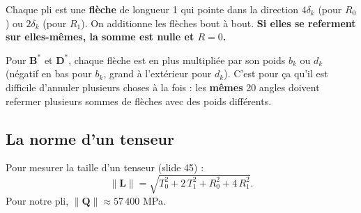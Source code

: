 \documentclass[11pt,a4paper]{article}
\newcommand{\Bs}{\mathbf{B}^{*}}
\newcommand{\Ds}{\mathbf{D}^{*}}
\newcommand{\Q}{\mathbf{Q}}
\begin{document}
\begin{idee}
Chaque pli est une \textbf{flèche} de longueur 1 qui pointe dans la
direction $4\delta_k$ (pour $R_0$) ou $2\delta_k$ (pour $R_1$). On additionne
les flèches bout à bout. \textbf{Si elles se referment sur elles-mêmes, la
somme est nulle et $R = 0$.}
\end{idee}

\begin{center}
\end{center}

Pour $\Bs$ et $\Ds$, chaque flèche est en plus multipliée par son poids
$b_k$ ou $d_k$ (négatif en bas pour $b_k$, grand à l'extérieur pour $d_k$).
C'est pour ça qu'il est difficile d'annuler plusieurs choses à la fois : les
\textbf{mêmes} 20 angles doivent refermer plusieurs sommes de flèches avec
des poids différents.

\subsection{La norme d'un tenseur}
Pour mesurer la \og taille\fg{} d'un tenseur (slide 45) :
\[
\|\mathbf{L}\| = \sqrt{T_0^2 + 2\,T_1^2 + R_0^2 + 4\,R_1^2}.
\]
Pour notre pli, $\|\Q\| \approx 57\,400$ MPa.
\end{document}

